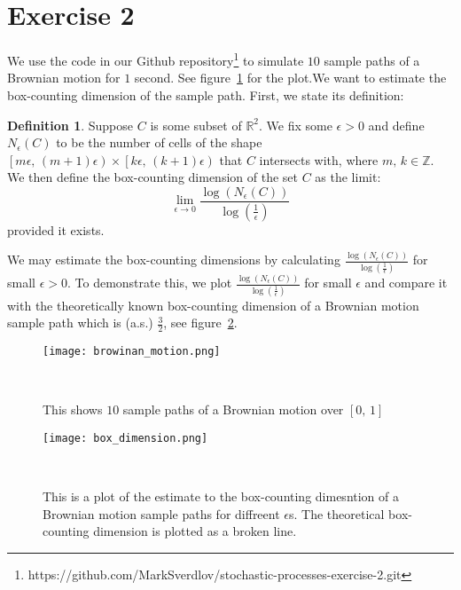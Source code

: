 \documentclass{amsart}
\theoremstyle{plain}
\theoremstyle{definition}
\newtheorem{definition}[section]{Definition}
\theoremstyle{definition}
\theoremstyle{remark}
\begin{document}
\section{Exercise 2}
We use the code in our Github repository\footnote{https://github.com/MarkSverdlov/stochastic-processes-exercise-2.git} to simulate \(10\) sample paths of a Brownian motion for \(1\) second. See figure~\ref{fig:brownian-motion} for the plot.We want to estimate the box-counting dimension of the sample path. First, we state its definition:
\begin{definition}
    Suppose \(C\) is some subset of \(\mathbb{R}^{2}\). We fix some \(\epsilon>0\) and define \(N_{\epsilon}\left(C\right)\) to be the number of cells of the shape \(\left[m \epsilon,\,\left(m+1\right) \epsilon\right) \times \left[k \epsilon,\,\left(k+1\right) \epsilon\right)\) that \(C\) intersects with, where \(m,\,k \in \mathbb{Z}\). We then define the box-counting dimension of the set \(C\) as the limit:
    \begin{equation*}
        \lim_{\epsilon\rightarrow 0} \frac{\log \left(N_{\epsilon}\left(C\right)\right)}{\log \left(\frac{1}{\epsilon}\right)}
    \end{equation*}
    provided it exists.
\end{definition}

We may estimate the box-counting dimensions by calculating \(\frac{\log \left(N_{\epsilon}\left(C\right)\right)}{\log \left(\frac{1}{\epsilon}\right)}
\) for small \(\epsilon >0\). To demonstrate this, we plot \(\frac{\log \left(N_{\epsilon}\left(C\right)\right)}{\log \left(\frac{1}{\epsilon}\right)}
\) for small \(\epsilon\) and compare it with the theoretically known box-counting dimension of a Brownian motion sample path which is (a.s.) \(\frac{3}{2}\), see figure~\ref{fig:box-dim}.

\begin{figure}
    \texttt{[image: browinan\_motion.png]}
    \caption{This shows \(10\) sample paths of a Brownian motion over \(\left[0,\,1\right]\)}~\label{fig:brownian-motion}
\end{figure}

\begin{figure}
    \texttt{[image: box\_dimension.png]}
    \caption{This is a plot of the estimate to the box-counting dimesntion of a Brownian motion sample paths for diffreent \(\epsilon\)s. The theoretical box-counting dimension is plotted as a broken line.}~\label{fig:box-dim}
\end{figure}
\end{document}
